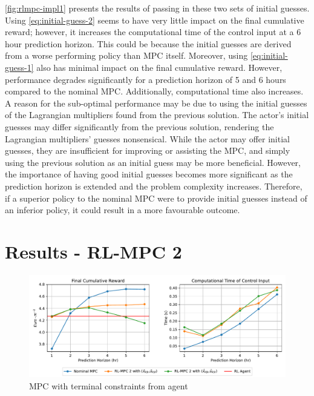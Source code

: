 \autoref{fig:rlmpc-impl1} presents the results of passing in  these two sets of initial guesses. Using \autoref{eq:initial-guess-2} seems to have very little impact on the final cumulative reward; however, it increases the computational time of the control input at a 6 hour prediction horizon. This could be because the initial guesses are derived from a worse performing policy than MPC itself. Moreover, using \autoref{eq:initial-guess-1} also has minimal impact on the final cumulative reward. However, performance degrades significantly for a prediction horizon of 5 and 6 hours compared to the nominal MPC. Additionally, computational time also increases. A reason for the sub-optimal performance may be due to using the initial guesses of the Lagrangian multipliers found from the previous solution. The actor's initial guesses may differ significantly from the previous solution, rendering the Lagrangian multipliers' guesses nonsensical. While the actor may offer initial guesses, they are insufficient for improving or assisting the MPC, and simply using the previous solution as an initial guess may be more beneficial. However, the importance of having good initial guesses becomes more significant as the prediction horizon is extended and the problem complexity increases. Therefore, if a superior policy to the nominal MPC were to provide initial guesses instead of an inferior policy, it could result in a more favourable outcome.

\section{Results - RL-MPC 2}

\begin{figure}[H]
	\centering
	\includegraphics[width=\textwidth]{figures/rl_mpc_impl_2.pdf}
	\caption{MPC with terminal constraints from agent}
	\label{fig:rlmpc-impl2}
\end{figure}

